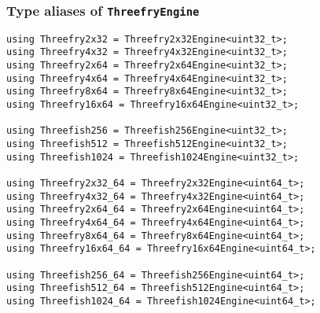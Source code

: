 \subsubsection{Type aliases of \texttt{ThreefryEngine}}

\begin{verbatim}
using Threefry2x32 = Threefry2x32Engine<uint32_t>;
using Threefry4x32 = Threefry4x32Engine<uint32_t>;
using Threefry2x64 = Threefry2x64Engine<uint32_t>;
using Threefry4x64 = Threefry4x64Engine<uint32_t>;
using Threefry8x64 = Threefry8x64Engine<uint32_t>;
using Threefry16x64 = Threefry16x64Engine<uint32_t>;

using Threefish256 = Threefish256Engine<uint32_t>;
using Threefish512 = Threefish512Engine<uint32_t>;
using Threefish1024 = Threefish1024Engine<uint32_t>;

using Threefry2x32_64 = Threefry2x32Engine<uint64_t>;
using Threefry4x32_64 = Threefry4x32Engine<uint64_t>;
using Threefry2x64_64 = Threefry2x64Engine<uint64_t>;
using Threefry4x64_64 = Threefry4x64Engine<uint64_t>;
using Threefry8x64_64 = Threefry8x64Engine<uint64_t>;
using Threefry16x64_64 = Threefry16x64Engine<uint64_t>;

using Threefish256_64 = Threefish256Engine<uint64_t>;
using Threefish512_64 = Threefish512Engine<uint64_t>;
using Threefish1024_64 = Threefish1024Engine<uint64_t>;
\end{verbatim}

\section{\texorpdfstring{\mkl \rng}{MKL RNG}}
\label{sec:MKL RNG}

